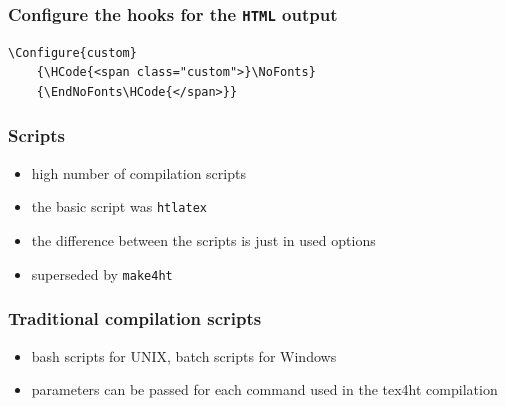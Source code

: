 \begin{frame}[fragile]
  \frametitle{Configure the hooks for the \texttt{HTML} output}
  \begin{verbatim}
\Configure{custom}
    {\HCode{<span class="custom">}\NoFonts}
    {\EndNoFonts\HCode{</span>}}
\end{verbatim}
\end{frame}




\begin{frame}

  \frametitle{Scripts}
  \begin{itemize}
    \item high number of compilation scripts
    \item the basic script was \texttt{htlatex} 
    \item the difference between the scripts is just in used options
    \item superseded by \texttt{make4ht}
\end{itemize}
\end{frame}

\begin{frame}[fragile]
  \frametitle{Traditional compilation scripts}
  \begin{itemize}
    \item bash scripts for UNIX, batch scripts for Windows
    \item parameters can be passed for each command used in the tex4ht compilation
  \end{itemize}
\end{frame}

